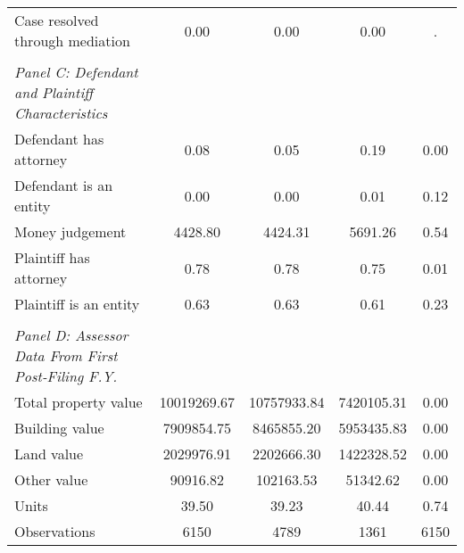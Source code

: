 {\begin{tabular}{l*{4}{c}}
\hspace{0.25cm}Case resolved through mediation&       0.00 &       0.00 &       0.00 &           .\\
\vspace{0.1em} \\ \emph{Panel C: Defendant and Plaintiff Characteristics}&            &            &            &            \\
\hspace{0.25cm}Defendant has attorney&       0.08 &       0.05 &       0.19 &        0.00\\
\hspace{0.25cm}Defendant is an entity&       0.00 &       0.00 &       0.01 &        0.12\\
\hspace{0.25cm}Money judgement&    4428.80 &    4424.31 &    5691.26 &        0.54\\
\hspace{0.25cm}Plaintiff has attorney&       0.78 &       0.78 &       0.75 &        0.01\\
\hspace{0.25cm}Plaintiff is an entity&       0.63 &       0.63 &       0.61 &        0.23\\
\vspace{0.1em} \\ \emph{Panel D: Assessor Data From First Post-Filing F.Y.}&            &            &            &            \\
\hspace{0.25cm}Total property value&10019269.67 &10757933.84 & 7420105.31 &        0.00\\
\hspace{0.25cm}Building value& 7909854.75 & 8465855.20 & 5953435.83 &        0.00\\
\hspace{0.25cm}Land value& 2029976.91 & 2202666.30 & 1422328.52 &        0.00\\
\hspace{0.25cm}Other value&   90916.82 &  102163.53 &   51342.62 &        0.00\\
\hspace{0.25cm}Units&      39.50 &      39.23 &      40.44 &        0.74\\
\midrule
Observations        &        6150&        4789&        1361&        6150\\
\bottomrule
\end{tabular}
}

